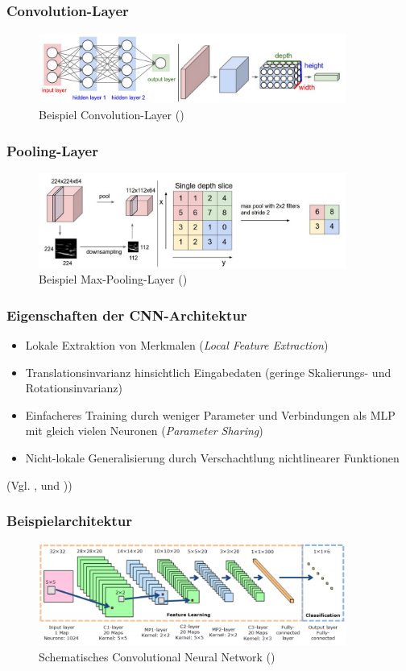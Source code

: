 \documentclass{beamer}
\begin{document}
\begin{frame}
\frametitle{Convolution-Layer}
\begin{figure}
\centering
\includegraphics[width=0.9\textwidth]{images/3_cnn_kernel}
\caption{Beispiel Convolution-Layer (\cite{Kaparthy2014})}
\end{figure}
\end{frame}

\begin{frame}
\frametitle{Pooling-Layer}
\begin{figure}
\centering
\includegraphics[width=0.9\textwidth]{images/3_cnn_subsampling}
\caption{Beispiel Max-Pooling-Layer (\cite{Kaparthy2014})}
\end{figure}
\end{frame}

\begin{frame}
\frametitle{Eigenschaften der CNN-Architektur}
\begin{itemize}
\item Lokale Extraktion von Merkmalen (\textit{Local Feature Extraction})
\item Translationsinvarianz hinsichtlich Eingabedaten (geringe Skalierungs- und Rotationsinvarianz)
\item Einfacheres Training durch weniger Parameter und Verbindungen als MLP mit gleich vielen Neuronen (\textit{Parameter Sharing})
\item Nicht-lokale Generalisierung durch Verschachtlung nichtlinearer Funktionen
\end{itemize}
(Vgl. \cite{LeCun1998}, \cite{Bengio2007b} und \cite{Zeiler2014}))
\end{frame}

\begin{frame}
\frametitle{Beispielarchitektur}
\begin{figure}
\centering
\includegraphics[width=0.9\textwidth]{images/3_CNN_Architecture}
\caption{Schematisches Convolutional Neural Network (\cite{Nagi2011})}
\end{figure}
\end{frame}
\end{document}
